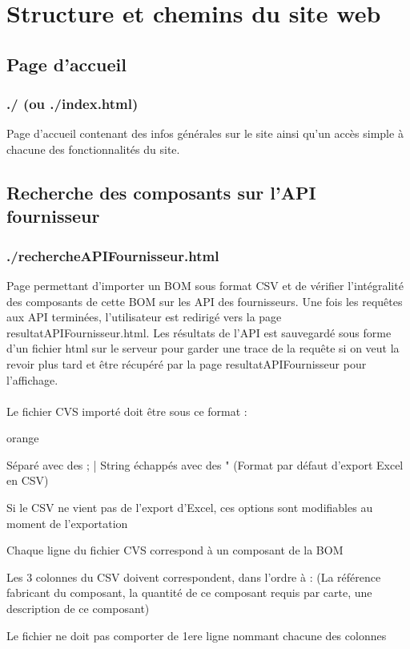 {\chapter{Structure et chemins du site web}

\section{Page d’accueil}

\subsection{./ (ou ./index.html)}

Page d’accueil contenant des infos générales sur le site ainsi qu’un accès simple à chacune des fonctionnalités du site.

\section{Recherche des composants sur l’API fournisseur}

\subsection{./rechercheAPIFournisseur.html}

Page permettant d’importer un BOM sous format CSV et de vérifier l’intégralité des composants de cette BOM sur les API des fournisseurs. Une fois les requêtes aux API terminées, l’utilisateur est redirigé vers la page resultatAPIFournisseur.html. Les résultats de l’API est sauvegardé sous forme d’un fichier html sur le serveur pour garder une trace de la requête si on veut la revoir plus tard et être récupéré par la page resultatAPIFournisseur pour l’affichage.
\\ \\
Le fichier CVS importé doit être sous ce format :

\begin{items}{orange}{\Triangle}
\item Séparé avec des ; | String échappés avec des " (Format par défaut d’export Excel en CSV)
\item Si le CSV ne vient pas de l’export d’Excel, ces options sont modifiables au moment de l’exportation
\item Chaque ligne du fichier CVS correspond à un composant de la BOM
\item Les 3 colonnes du CSV doivent correspondent, dans l’ordre à : (La référence fabricant du composant, la quantité de ce composant requis par carte, une description de ce composant)
\item Le fichier ne doit pas comporter de 1ere ligne nommant chacune des colonnes
\end{items}

}
